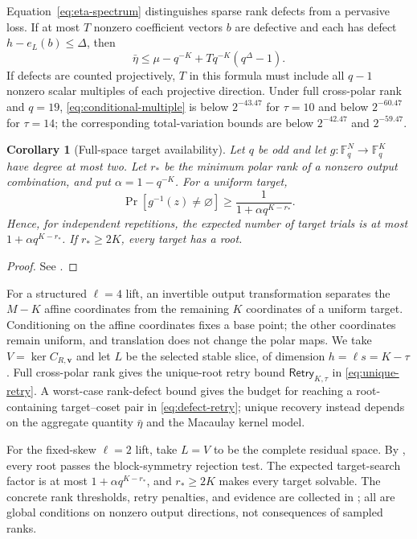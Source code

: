 \documentclass[11pt]{article}
\newtheorem{corollary}[corollary]{Corollary}
\newcommand{\F}{\mathbb F}
\begin{document}
Equation~\eqref{eq:eta-spectrum} distinguishes sparse rank defects from a
pervasive loss.  If at most $T$ nonzero coefficient vectors $b$ are defective
and each has defect $h-e_L(b)\le\Delta$, then
\begin{equation}\label{eq:defect-spectrum}
 \bar\eta\le
 \mu-q^{-K}+Tq^{-K}(q^\Delta-1).
\end{equation}
If defects are counted projectively, $T$ in this formula must include all
$q-1$ nonzero scalar multiples of each projective direction.  Under full
cross-polar rank and $q=19$, \eqref{eq:conditional-multiple} is below
$2^{-43.47}$ for $\tau=10$ and below $2^{-60.47}$ for $\tau=14$; the
corresponding total-variation bounds are below $2^{-42.47}$ and $2^{-59.47}$.

\begin{corollary}[Full-space target availability]\label{cor:full-space}
Let $q$ be odd and let $g:\F_q^N\to\F_q^K$ have degree at most two.  Let
$r_*$ be the
minimum polar rank of a nonzero output combination, and put
$\alpha=1-q^{-K}$.  For a uniform target,
\begin{equation}\label{eq:full-space-success}
 \Pr[g^{-1}(z)\ne\varnothing]
 \ge \frac{1}{1+\alpha q^{K-r_*}}.
\end{equation}
Hence, for independent repetitions, the expected number of target trials is at most
$1+\alpha q^{K-r_*}$.  If $r_*\ge2K$, every target has a root.
\end{corollary}

\begin{proof}
See .
\end{proof}

For a structured $\ell=4$ lift, an invertible output transformation separates
the $M-K$ affine coordinates from the remaining $K$ coordinates of a uniform
target.  Conditioning on the affine coordinates fixes a base point; the other
coordinates remain uniform, and translation does not change the polar maps.
We take $V=\ker C_{R,\mathbf v}$ and let $L$ be the selected stable slice, of dimension
$h=\ell s=K-\tau$.  Full cross-polar rank gives the unique-root retry bound
$\mathsf{Retry}_{K,\tau}$ in \eqref{eq:unique-retry}.  A worst-case
rank-defect bound gives the budget for reaching a root-containing target--coset
pair in \eqref{eq:defect-retry}; unique recovery instead
depends on the aggregate quantity $\bar\eta$ and the Macaulay kernel model.

For the fixed-skew $\ell=2$ lift, take $L=V$ to be the complete residual space.
By , every root passes the block-symmetry rejection test.  The
expected target-search
factor is at most $1+\alpha q^{K-r_*}$, and $r_*\ge2K$ makes every target
solvable.  The concrete rank thresholds, retry penalties, and evidence are
collected in ; all are global
conditions on nonzero output directions, not consequences of sampled ranks.
\end{document}
